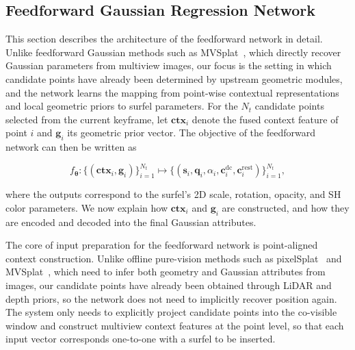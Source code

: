 \documentclass[lettersize,journal]{IEEEtran}
\begin{document}
\subsection{Feedforward Gaussian Regression Network}

This section describes the architecture of the feedforward network in detail. Unlike feedforward Gaussian methods such as MVSplat~\cite{chen2024mvsplat}, which directly recover Gaussian parameters from multiview images, our focus is the setting in which candidate points have already been determined by upstream geometric modules, and the network learns the mapping from point-wise contextual representations and local geometric priors to surfel parameters. For the $N_t$ candidate points selected from the current keyframe, let $\mathbf{ctx}_i$ denote the fused context feature of point $i$ and $\mathbf{g}_i$ its geometric prior vector. The objective of the feedforward network can then be written as

\begin{equation}
f_{\boldsymbol{\theta}} : \{(\mathbf{ctx}_i, \mathbf{g}_i)\}_{i=1}^{N_t}
\mapsto
\{(\mathbf{s}_i, \mathbf{q}_i, \alpha_i, \mathbf{c}_i^{\mathrm{dc}}, \mathbf{c}_i^{\mathrm{rest}})\}_{i=1}^{N_t},
\end{equation}

where the outputs correspond to the surfel's 2D scale, rotation, opacity, and SH color parameters. We now explain how $\mathbf{ctx}_i$ and $\mathbf{g}_i$ are constructed, and how they are encoded and decoded into the final Gaussian attributes.

 The core of input preparation for the feedforward network is point-aligned context construction. Unlike offline pure-vision methods such as pixelSplat~\cite{charatan2024pixelsplat} and MVSplat~\cite{chen2024mvsplat}, which need to infer both geometry and Gaussian attributes from images, our candidate points have already been obtained through LiDAR and depth priors, so the network does not need to implicitly recover position again. The system only needs to explicitly project candidate points into the co-visible window and construct multiview context features at the point level, so that each input vector corresponds one-to-one with a surfel to be inserted.
\end{document}
